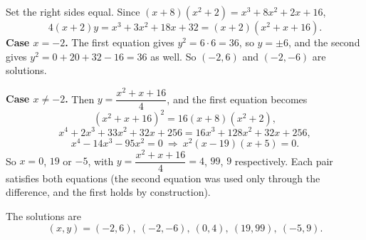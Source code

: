 Set the right sides equal. Since $(x+8)\left(x^2+2\right)=x^3+8x^2+2x+16$,
\[
4(x+2)y=x^3+3x^2+18x+32=(x+2)\left(x^2+x+16\right).
\]
\textbf{Case $x=-2$.} The first equation gives $y^2=6\cdot6=36$, so $y=\pm6$, and the second gives $y^2=0+20+32-16=36$ as well. So $(-2,6)$ and $(-2,-6)$ are solutions.

\textbf{Case $x\ne-2$.} Then $y=\dfrac{x^2+x+16}{4}$, and the first equation becomes
\[
\left(x^2+x+16\right)^2=16(x+8)\left(x^2+2\right),
\]
\[
x^4+2x^3+33x^2+32x+256=16x^3+128x^2+32x+256,
\]
\[
x^4-14x^3-95x^2=0\ \Longrightarrow\ x^2(x-19)(x+5)=0 .
\]
So $x=0$, $19$ or $-5$, with $y=\dfrac{x^2+x+16}{4}=4$, $99$, $9$ respectively. Each pair satisfies both equations (the second equation was used only through the difference, and the first holds by construction).

The solutions are
\[
\boxed{(x,y)=(-2,6),\ (-2,-6),\ (0,4),\ (19,99),\ (-5,9)} .
\]
